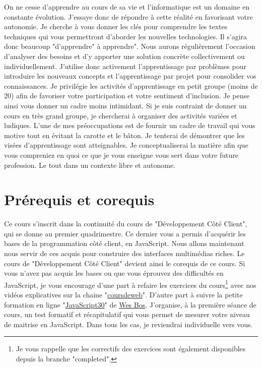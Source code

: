 On ne cesse d’apprendre au cours de sa vie et l’informatique est un domaine en constante évolution. J’essaye donc de répondre à cette réalité en favorisant votre autonomie. Je cherche à vous donner les clés pour comprendre les textes techniques qui vous permettront d’aborder les nouvelles technologies. Il s’agira donc beaucoup "d’apprendre" à apprendre". Nous aurons régulièrement l’occasion d’analyser des besoins et d’y apporter une solution concrète collectivement ou individuellement. J’utilise donc activement l’apprentissage par problèmes pour introduire les nouveaux concepts et l’apprentissage par projet pour consolider vos connaissances. Je privilégie les activités d’apprentissage en petit groupe (moins de 20) afin de favoriser votre participation et votre sentiment d’inclusion. Je pense ainsi vous donner un cadre moins intimidant. Si je suis contraint de donner un cours en très grand groupe, je chercherai à organiser des activités variées et ludiques.
L’une de mes préoccupations est de fournir un cadre de travail qui vous motive tout en évitant la carotte et le bâton. Je tenterai de démontrer que les visées d’apprentissage sont atteignables. Je conceptualiserai la matière afin que vous compreniez en quoi ce que je vous enseigne vous sert dans votre future profession. Le tout dans un contexte libre et autonome.

\clearpage
\section{Prérequis et corequis}

Ce cours s’inscrit dans la continuité du cours de "Développement Côté Client", qui se donne au premier quadrimestre. Ce dernier vous a permis d’acquérir les bases de la programmation côté client, en JavaScript. Nous allons maintenant nous servir de ces acquis pour construire des interfaces multimédias riches. Le cours de "Développement Côté Client" devient ainsi le corequis de ce cours.
Si vous n’avez pas acquis les bases ou que vous éprouvez des difficultés en JavaScript, je vous encourage d’une part à refaire les exercices du cours\footnote{Je vous rappelle que les correctifs des exercices sont également disponibles depuis la branche "completed".} avec nos vidéos explicatives sur la chaine "\href{https://www.youtube.com/@coursdeweb}{coursdeweb}". D’autre part à suivre la petite formation en ligne "\href{https://javascript30.com}{JavaScript30}" de \href{https://wesbos.com}{Wes Bos}. J'organise, à la première séance de cours, un test formatif et récapitulatif qui vous permet de mesurer votre niveau de maitrise en JavaScript. Dans tous les cas, je reviendrai individuelle vers vous.

